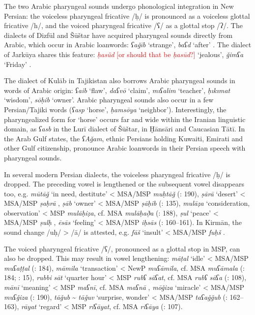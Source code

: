 \documentclass[output=paper]{langsci/langscibook}
\begin{document}

The two Arabic pharyngeal sounds undergo phonological integration in New Persian: the voiceless pharyngeal fricative /ḥ/ is pronounced as a voiceless glottal fricative /h/, and the voiced pharyngeal fricative /ʕ/ as a glottal stop /ʔ/. The dialects of Dizfūl and Šūštar have acquired pharyngeal sounds directly from Arabic, which occur in Arabic loanwords: \textit{ʕaǧīb} ‘strange’, \textit{baʕd} ‘after’ \citep{MacKinnon2015}. The dialect of Jarkūya shares this feature: \textcolor{red}{\textit{ḥasüd} [or should that be \textit{ḥasūd}?]} ‘jealous’, \textit{ǧimʕa} ‘Friday’ \citep{Borjian2008}.

The dialect of Kulāb in Tajikistan also borrows Arabic pharyngeal sounds in words of Arabic origin: \textit{ʕaib} ‘flaw’, \textit{daʕvō} ‘claim’, \textit{mıʕalim} ‘teacher’, \textit{ḥıkımat} ‘wisdom’, \textit{sōḥib} ‘owner’. Arabic pharyngeal sounds also occur in a few Persian/Tajiki words (\textit{ʕasp} ‘horse’, \textit{ḥamsōya} ‘neighbor’). Interestingly, the pharyngealized form for ‘horse’ occurs far and wide within the Iranian linguistic domain, as \textit{ʕasb} in the Lurī dialect of Šūštar, in Ḫānsāri and Caucasian Tātī. In the Arab Gulf states, the \textit{ʕAǧam}, ethnic Persians holding Kuwaiti, Emirati and other Gulf citizenship, pronounce Arabic loanwords in their Persian speech with pharyngeal sounds.


In several modern Persian dialects, the voiceless pharyngeal fricative /ḥ/ is dropped. The preceding vowel is lengthened or the subsequent vowel disappears too, e.g. \textit{mūtāǧ} ‘in need, destitute’ < MSA/MSP \textit{muḥtāǧ} (\citealt{Īzadpanāh2001}: 190), \textit{ṣārā} ‘desert’ < MSA/MSP \textit{ṣaḥrā} \citep[15]{Sarlak2002}, \textit{ṣāb} ‘owner’ < MSA/MSP \textit{ṣāḥib} (\citealt{Ṣarrāfī1996}: 135), \textit{mulāẓa} ‘consideration, observation’ < MSP \textit{mulāḥiẓa}, cf. MSA \textit{mulāḥað̣a} (\citealt{Ṣarrāfī1996}: 188), \textit{ṣul} ‘peace’ < MSA/MSP \textit{ṣulḥ} \citep{Stilo2001}, \textit{ēsās} ‘feeling’ < MSA/MSP \textit{iḥsās} (\citealt{Salāmī2004}: 160–161). In Kirmān, the sound change /uḥ/ > /ā/ is attested, e.g. \textit{fāš} ‘insult’ < MSA/MSP \textit{fuḥš} \citep{Borjian2017}.

    The voiced pharyngeal fricative /ʕ/, pronounced as a glottal stop in MSP, can also be dropped. This may result in vowel lengthening: \textit{māṭal} ‘idle’ < MSA/MSP \textit{muʕaṭṭal} (\citealt{Ṣarrāfī1996}: 184), \textit{māmila} ‘transaction’ < NewP \textit{muʕāmila}, cf. MSA \textit{muʕāmala} (\citealt{Ṣarrāfī1996}: 184; \citealt{Sarlak2002}: 15), \textit{rubbi} \textit{sāt} ‘quarter hour’ < MSP \textit{rubʕ} \textit{sāʕat}, cf. MSA \textit{rubʕ} \textit{sāʕa} (\citealt{Ṣarrāfī1996}: 108), \textit{mānī} ‘meaning’ < MSP \textit{maʕnī}, cf. MSA \textit{maʕnā} \citep[15]{Sarlak2002}, \textit{mōǧiza} ‘miracle’ < MSA/MSP \textit{muʕǧiza} (\citealt{Īzadpanāh2001}: 190), \textit{tāǧub} \~{} \textit{tāǧuv} ‘surprise, wonder’ < MSA/MSP \textit{taʕaǧǧub} (\citealt{Salāmī2004}: 162–163), \textit{rāyat} ‘regard’ < MSP \textit{riʕāyat}, cf. MSA \textit{riʕāya} (\citealt{Ṣarrāfī1996}: 107).
\end{document}
